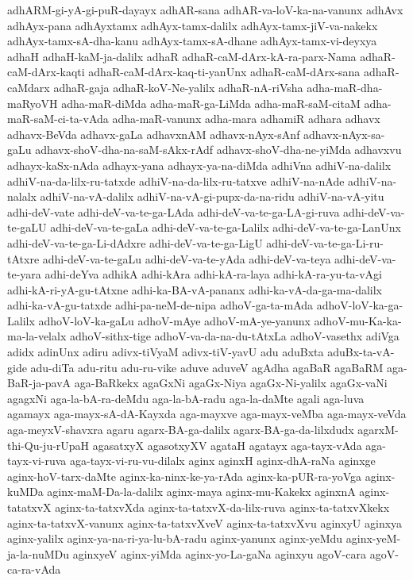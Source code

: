 {adhARM-gi-yA-gi-puR-dayayx
adhAR-sana
adhAR-va-loV-ka-na-vanunx
adhAvx
adhAyx-pana
adhAyxtamx
adhAyx-tamx-dalilx
adhAyx-tamx-jiV-va-nakekx
adhAyx-tamx-sA-dha-kanu
adhAyx-tamx-sA-dhane
adhAyx-tamx-vi-deyxya
adhaH
adhaH-kaM-ja-dalilx
adhaR
adhaR-caM-dArx-kA-ra-parx-Nama
adhaR-caM-dArx-kaqti
adhaR-caM-dArx-kaq-ti-yanUnx
adhaR-caM-dArx-sana
adhaR-caMdarx
adhaR-gaja
adhaR-koV-Ne-yalilx
adhaR-nA-riVsha
adha-maR-dha-maRyoVH
adha-maR-diMda
adha-maR-ga-LiMda
adha-maR-saM-citaM
adha-maR-saM-ci-ta-vAda
adha-maR-vanunx
adha-mara
adhamiR
adhara
adhavx
adhavx-BeVda
adhavx-gaLa
adhavxnAM
adhavx-nAyx-sAnf
adhavx-nAyx-sa-gaLu
adhavx-shoV-dha-na-saM-sAkx-rAdf
adhavx-shoV-dha-ne-yiMda
adhavxvu
adhayx-kaSx-nAda
adhayx-yana
adhayx-ya-na-diMda
adhiVna
adhiV-na-dalilx
adhiV-na-da-lilx-ru-tatxde
adhiV-na-da-lilx-ru-tatxve
adhiV-na-nAde
adhiV-na-nalalx
adhiV-na-vA-dalilx
adhiV-na-vA-gi-pupx-da-na-ridu
adhiV-na-vA-yitu
adhi-deV-vate
adhi-deV-va-te-ga-LAda
adhi-deV-va-te-ga-LA-gi-ruva
adhi-deV-va-te-gaLU
adhi-deV-va-te-gaLa
adhi-deV-va-te-ga-Lalilx
adhi-deV-va-te-ga-LanUnx
adhi-deV-va-te-ga-Li-dAdxre
adhi-deV-va-te-ga-LigU
adhi-deV-va-te-ga-Li-ru-tAtxre
adhi-deV-va-te-gaLu
adhi-deV-va-te-yAda
adhi-deV-va-teya
adhi-deV-va-te-yara
adhi-deYva
adhikA
adhi-kAra
adhi-kA-ra-laya
adhi-kA-ra-yu-ta-vAgi
adhi-kA-ri-yA-gu-tAtxne
adhi-ka-BA-vA-pananx
adhi-ka-vA-da-ga-ma-dalilx
adhi-ka-vA-gu-tatxde
adhi-pa-neM-de-nipa
adhoV-ga-ta-mAda
adhoV-loV-ka-ga-Lalilx
adhoV-loV-ka-gaLu
adhoV-mAye
adhoV-mA-ye-yanunx
adhoV-mu-Ka-ka-ma-la-velalx
adhoV-sithx-tige
adhoV-va-da-na-du-tAtxLa
adhoV-vasethx
adiVga
adidx
adinUnx
adiru
adivx-tiVyaM
adivx-tiV-yavU
adu
aduBxta
aduBx-ta-vA-gide
adu-diTa
adu-ritu
adu-ru-vike
aduve
aduveV
agAdha
agaBaR
agaBaRM
aga-BaR-ja-pavA
aga-BaRkekx
agaGxNi
agaGx-Niya
agaGx-Ni-yalilx
agaGx-vaNi
agagxNi
aga-la-bA-ra-deMdu
aga-la-bA-radu
aga-la-daMte
agali
aga-luva
agamayx
aga-mayx-sA-dA-Kayxda
aga-mayxve
aga-mayx-veMba
aga-mayx-veVda
aga-meyxV-shavxra
agaru
agarx-BA-ga-dalilx
agarx-BA-ga-da-lilxdudx
agarxM-thi-Qu-ju-rUpaH
agasatxyX
agasotxyXV
agataH
agatayx
aga-tayx-vAda
aga-tayx-vi-ruva
aga-tayx-vi-ru-vu-dilalx
aginx
aginxH
aginx-dhA-raNa
aginxge
aginx-hoV-tarx-daMte
aginx-ka-ninx-ke-ya-rAda
aginx-ka-pUR-ra-yoVga
aginx-kuMDa
aginx-maM-Da-la-dalilx
aginx-maya
aginx-mu-Kakekx
aginxnA
aginx-tatatxvX
aginx-ta-tatxvXda
aginx-ta-tatxvX-da-lilx-ruva
aginx-ta-tatxvXkekx
aginx-ta-tatxvX-vanunx
aginx-ta-tatxvXveV
aginx-ta-tatxvXvu
aginxyU
aginxya
aginx-yalilx
aginx-ya-na-ri-ya-lu-bA-radu
aginx-yanunx
aginx-yeMdu
aginx-yeM-ja-la-nuMDu
aginxyeV
aginx-yiMda
aginx-yo-La-gaNa
aginxyu
agoV-cara
agoV-ca-ra-vAda
}
